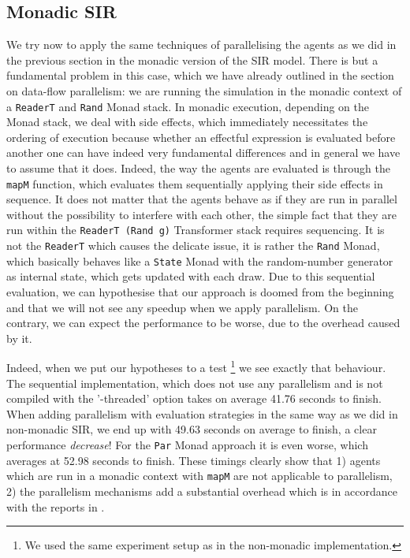 \subsection{Monadic SIR}
We try now to apply the same techniques of parallelising the agents as we did in the previous section in the monadic version of the SIR model. There is but a fundamental problem in this case, which we have already outlined in the section on data-flow parallelism: we are running the simulation in the monadic context of a \texttt{ReaderT} and \texttt{Rand} Monad stack. In monadic execution, depending on the Monad stack, we deal with side effects, which immediately necessitates the ordering of execution because whether an effectful expression is evaluated before another one can have indeed very fundamental differences and in general we have to assume that it does.
Indeed, the way the agents are evaluated is through the \texttt{mapM} function, which evaluates them sequentially applying their side effects in sequence. It does not matter that the agents behave as if they are run in parallel without the possibility to interfere with each other, the simple fact that they are run within the \texttt{ReaderT (Rand g)} Transformer stack requires sequencing. It is not the \texttt{ReaderT} which causes the delicate issue, it is rather the \texttt{Rand} Monad, which basically behaves like a \texttt{State} Monad with the random-number generator as internal state, which gets updated with each draw.
Due to this sequential evaluation, we can hypothesise that our approach is doomed from the beginning and that we will not see any speedup  when we apply parallelism. On the contrary, we can expect the performance to be worse, due to the overhead caused by it.

Indeed, when we put our hypotheses to a test \footnote{We used the same experiment setup as in the non-monadic implementation.} we see exactly that behaviour. The sequential implementation, which does not use any parallelism and is not compiled with the '-threaded' option takes on average 41.76 seconds to finish. When adding parallelism with evaluation strategies in the same way as we did in non-monadic SIR, we end up with 49.63 seconds on average to finish, a clear performance \textit{decrease}! For the \texttt{Par} Monad approach it is even worse, which averages at 52.98 seconds to finish. These timings clearly show that 1) agents which are run in a monadic context with \texttt{mapM} are not applicable to parallelism, 2) the parallelism mechanisms add a substantial overhead which is in accordance with the reports in \cite{marlow_parallel_2013}.


